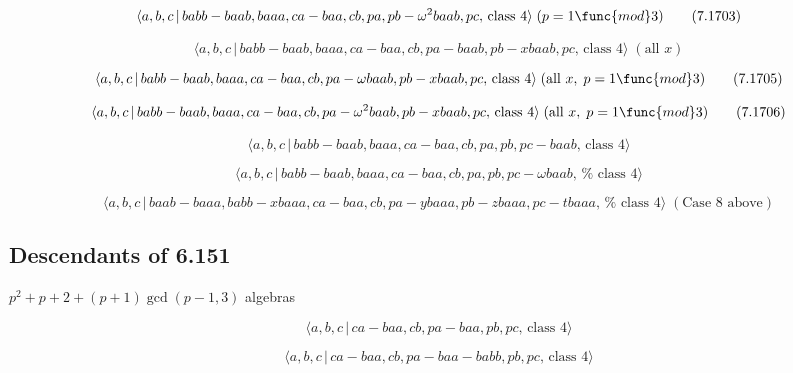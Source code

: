 \documentclass[10pt]{article}
\begin{document}
\begin{equation}
\langle a,b,c\,|\,babb-baab,baaa,ca-baa,cb,pa,pb-\omega ^{2}baab,pc,\,\text{%
class }4\rangle \;(p=1\func{mod}3)  \tag{7.1703}
\end{equation}

\begin{equation}
\langle a,b,c\,|\,babb-baab,baaa,ca-baa,cb,pa-baab,pb-xbaab,pc,\,\text{class 
}4\rangle \;(\text{all }x)  \tag{7.1704}
\end{equation}

\begin{equation}
\langle a,b,c\,|\,babb-baab,baaa,ca-baa,cb,pa-\omega baab,pb-xbaab,pc,\,%
\text{class }4\rangle \;(\text{all }x,\;p=1\func{mod}3)  \tag{7.1705}
\end{equation}

\begin{equation}
\langle a,b,c\,|\,babb-baab,baaa,ca-baa,cb,pa-\omega ^{2}baab,pb-xbaab,pc,\,%
\text{class }4\rangle \;(\text{all }x,\;p=1\func{mod}3)  \tag{7.1706}
\end{equation}

\begin{equation}
\langle a,b,c\,|\,babb-baab,baaa,ca-baa,cb,pa,pb,pc-baab,\,\text{class }%
4\rangle  \tag{7.1707}
\end{equation}

\begin{equation}
\langle a,b,c\,|\,babb-baab,baaa,ca-baa,cb,pa,pb,pc-\omega baab,\,\text{%
class }4\rangle  \tag{7.1708}
\end{equation}

\begin{equation}
\langle
a,b,c\,|\,baab-baaa,babb-xbaaa,ca-baa,cb,pa-ybaaa,pb-zbaaa,pc-tbaaa,\,\text{%
class }4\rangle \;(\text{Case 8 above})  \tag{7.1709}
\end{equation}

\subsection{Descendants of 6.151}

$p^{2}+p+2+(p+1)\gcd (p-1,3)$ algebras

\begin{equation}
\langle a,b,c\,|\,ca-baa,cb,pa-baa,pb,pc,\,\text{class }4\rangle 
\tag{7.1710}
\end{equation}

\begin{equation}
\langle a,b,c\,|\,ca-baa,cb,pa-baa-babb,pb,pc,\,\text{class }4\rangle 
\tag{7.1711}
\end{equation}
\end{document}
